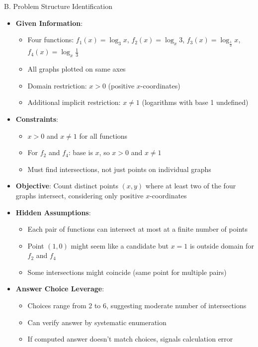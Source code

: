 \documentclass[12pt]{article}
\begin{document}
\begin{problemconfigbox}{B. Problem Structure Identification}
\begin{itemize}[leftmargin=*]
    \item \textbf{Given Information}: 
    \begin{itemize}
        \item Four functions: $f_1(x) = \log_3 x$, $f_2(x) = \log_x 3$, $f_3(x) = \log_{\frac{1}{3}} x$, $f_4(x) = \log_x \frac{1}{3}$
        \item All graphs plotted on same axes
        \item Domain restriction: $x > 0$ (positive $x$-coordinates)
        \item Additional implicit restriction: $x \neq 1$ (logarithms with base 1 undefined)
    \end{itemize}
    
    \item \textbf{Constraints}: 
    \begin{itemize}
        \item $x > 0$ and $x \neq 1$ for all functions
        \item For $f_2$ and $f_4$: base is $x$, so $x > 0$ and $x \neq 1$
        \item Must find intersections, not just points on individual graphs
    \end{itemize}
    
    \item \textbf{Objective}: Count distinct points $(x, y)$ where at least two of the four graphs intersect, considering only positive $x$-coordinates
    
    \item \textbf{Hidden Assumptions}: 
    \begin{itemize}
        \item Each pair of functions can intersect at most at a finite number of points
        \item Point $(1, 0)$ might seem like a candidate but $x = 1$ is outside domain for $f_2$ and $f_4$
        \item Some intersections might coincide (same point for multiple pairs)
    \end{itemize}
    
    \item \textbf{Answer Choice Leverage}: 
    \begin{itemize}
        \item Choices range from 2 to 6, suggesting moderate number of intersections
        \item Can verify answer by systematic enumeration
        \item If computed answer doesn't match choices, signals calculation error
    \end{itemize}
\end{itemize}
\end{problemconfigbox}
\end{document}
